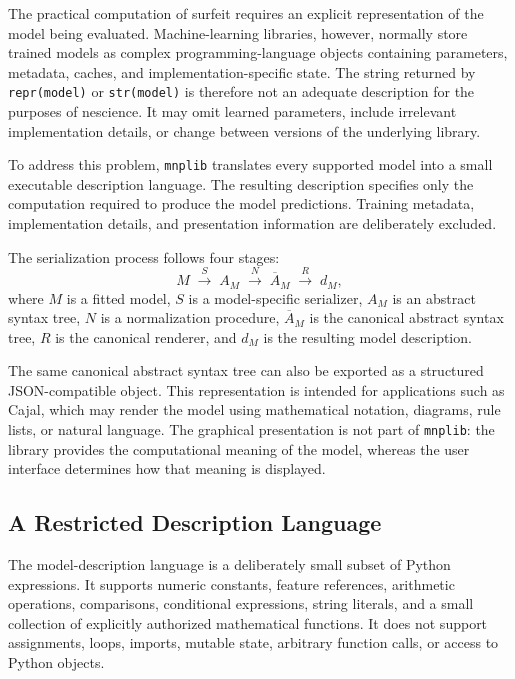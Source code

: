 
The practical computation of surfeit requires an explicit representation of
the model being evaluated. Machine-learning libraries, however, normally store
trained models as complex programming-language objects containing parameters,
metadata, caches, and implementation-specific state. The string returned by
\texttt{repr(model)} or \texttt{str(model)} is therefore not an adequate
description for the purposes of nescience. It may omit learned parameters,
include irrelevant implementation details, or change between versions of the
underlying library.

To address this problem, \texttt{mnplib} translates every supported model into
a small executable description language. The resulting description specifies
only the computation required to produce the model predictions. Training
metadata, implementation details, and presentation information are deliberately
excluded.

The serialization process follows four stages:
\[
M
\;\xrightarrow{\;S\;}\;
A_M
\;\xrightarrow{\;N\;}\;
\overline{A}_M
\;\xrightarrow{\;R\;}\;
d_M,
\]
where \(M\) is a fitted model, \(S\) is a model-specific serializer, \(A_M\)
is an abstract syntax tree, \(N\) is a normalization procedure,
\(\overline{A}_M\) is the canonical abstract syntax tree, \(R\) is the
canonical renderer, and \(d_M\) is the resulting model description.

The same canonical abstract syntax tree can also be exported as a structured
JSON-compatible object. This representation is intended for applications such
as Cajal, which may render the model using mathematical notation, diagrams,
rule lists, or natural language. The graphical presentation is not part of
\texttt{mnplib}: the library provides the computational meaning of the model,
whereas the user interface determines how that meaning is displayed.

\subsection{A Restricted Description Language}

The model-description language is a deliberately small subset of Python
expressions. It supports numeric constants, feature references, arithmetic
operations, comparisons, conditional expressions, string literals, and a small
collection of explicitly authorized mathematical functions. It does not support
assignments, loops, imports, mutable state, arbitrary function calls, or access
to Python objects.

